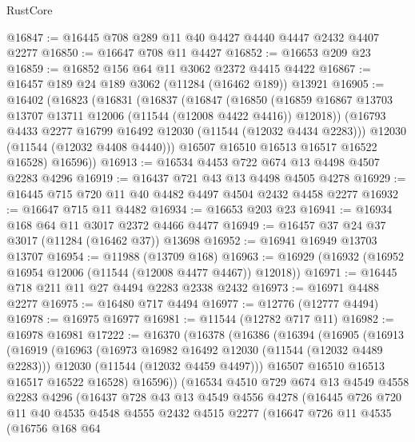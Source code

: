 \begin{lexlean}{RustCore}
\begin{coremodule}
@16847 := @16445 @708 @289 @11 @40 @4427 @4440 @4447 @2432 @4407 @2277
@16850 := @16647 @708 @11 @4427
@16852 := @16653 @209 @23
@16859 := @16852 @156 @64 @11 @3062 @2372 @4415 @4422
@16867 := @16457 @189 @24 @189 @3062 (@11284 (@16462 @189)) @13921
@16905 := @16402
    (@16823
      (@16831
        (@16837
          (@16847
            (@16850
              (@16859 @16867 @13703 @13707 @13711 @12006 (@11544 (@12008 @4422 @4416)) @12018))
            (@16793 @4433 @2277 @16799 @16492 @12030 (@11544 (@12032 @4434 @2283)))
            @12030
            (@11544 (@12032 @4408 @4440)))
          @16507
          @16510
          @16513
          @16517
          @16522
          @16528)
        @16596))
@16913 := @16534 @4453 @722 @674 @13 @4498 @4507 @2283 @4296
@16919 := @16437 @721 @43 @13 @4498 @4505 @4278
@16929 := @16445 @715 @720 @11 @40 @4482 @4497 @4504 @2432 @4458 @2277
@16932 := @16647 @715 @11 @4482
@16934 := @16653 @203 @23
@16941 := @16934 @168 @64 @11 @3017 @2372 @4466 @4477
@16949 := @16457 @37 @24 @37 @3017 (@11284 (@16462 @37)) @13698
@16952 := @16941 @16949 @13703 @13707
@16954 := @11988 (@13709 @168)
@16963 := @16929 (@16932 (@16952 @16954 @12006 (@11544 (@12008 @4477 @4467)) @12018))
@16971 := @16445 @718 @211 @11 @27 @4494 @2283 @2338 @2432
@16973 := @16971 @4488 @2277
@16975 := @16480 @717 @4494
@16977 := @12776 (@12777 @4494)
@16978 := @16975 @16977
@16981 := @11544 (@12782 @717 @11)
@16982 := @16978 @16981
@17222 := @16370
    (@16378
      (@16386
        (@16394
          (@16905
            (@16913
              (@16919
                (@16963
                  (@16973 @16982 @16492 @12030 (@11544 (@12032 @4489 @2283)))
                  @12030
                  (@11544 (@12032 @4459 @4497)))
                @16507
                @16510
                @16513
                @16517
                @16522
                @16528)
              @16596))
          (@16534
            @4510
            @729
            @674
            @13
            @4549
            @4558
            @2283
            @4296
            (@16437
              @728
              @43
              @13
              @4549
              @4556
              @4278
              (@16445
                @726
                @720
                @11
                @40
                @4535
                @4548
                @4555
                @2432
                @4515
                @2277
                (@16647
                  @726
                  @11
                  @4535
                  (@16756
                    @168
                    @64

\end{coremodule}
\end{lexlean}
